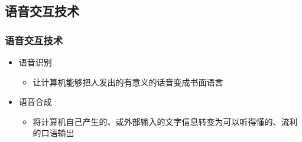 \documentclass{beamer}
\begin{document}
\subsection{语音交互技术}
\begin{frame}
	\frametitle{语音交互技术}
	\beamertemplatetransparentcovereddynamicmedium
	\begin{itemize}
		\item 语音识别
		\begin{itemize}
			\item 让计算机能够把人发出的有意义的话音变成书面语言
		\end{itemize}
		\pause
		\item 语音合成
		\begin{itemize}
			\item 将计算机自己产生的、或外部输入的文字信息转变为可以听得懂的、流利的口语输出
		\end{itemize}
	\end{itemize}
\end{frame}
\end{document}

